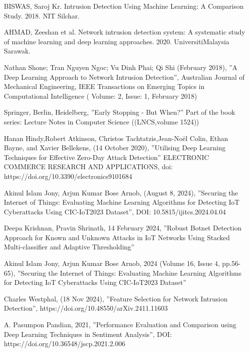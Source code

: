 \documentclass[conference]{IEEEtran}
\begin{document}
\begin{thebibliography}{00}


    BISWAS, Saroj Kr. Intrusion Detection Using Machine Learning: A Comparison Study. 2018. NIT Silchar.
    
    AHMAD, Zeeshan et al. Network intrusion detection system: A systematic study of machine learning and deep learning approaches. 2020. UniversitiMalaysia Sarawak.
    
     Nathan Shone; Tran Nguyen Ngoc; Vu Dinh Phai; Qi Shi  (February 2018), ''A Deep Learning Approach to Network Intrusion Detection'', Australian Journal of Mechanical Engineering, IEEE Transactions on Emerging Topics in Computational Intelligence ( Volume: 2, Issue: 1, February 2018)
    
     Springer, Berlin, Heidelberg, ''Early Stopping - But When?'' Part of the book series: Lecture Notes in Computer Science ((LNCS,volume 1524))
    
     Hanan Hindy,Robert Atkinson, Christos Tachtatzis,Jean-Noël Colin, Ethan Bayne, and Xavier Bellekens, (14 October 2020), ''Utilising Deep Learning Techniques for Effective Zero-Day Attack Detection'' ELECTRONIC COMMERCE RESEARCH AND APPLICATIONS, doi: https://doi.org/10.3390/electronics9101684
    
     Akinul Islam Jony, Arjun Kumar Bose Arnob, (August 8, 2024), ''Securing the Internet of Things: Evaluating Machine Learning Algorithms for Detecting IoT Cyberattacks Using CIC-IoT2023 Dataset'', DOI: 10.5815/ijitcs.2024.04.04
    
     Deepa Krishnan, Pravin Shrinath, 14 February 2024, ''Robust Botnet Detection Approach for Known and Unknown Attacks in IoT Networks Using Stacked Multi-classifier and Adaptive Thresholding''
    
     Akinul Islam Jony, Arjun Kumar Bose Arnob, 2024 (Volume 16, Issue 4, pp.56-65), ''Securing the Internet of Things: Evaluating Machine Learning Algorithms for Detecting IoT Cyberattacks Using CIC-IoT2023 Dataset''
    
     Charles Westphal, (18 Nov 2024), ''Feature Selection for Network Intrusion Detection'', https://doi.org/10.48550/arXiv.2411.11603
    
     A. Pasumpon Pandian, 2021, ''Performance Evaluation and Comparison using Deep Learning Techniques in Sentiment Analysis'', DOI: https://doi.org/10.36548/jscp.2021.2.006
    

\end{thebibliography}
\end{document}
